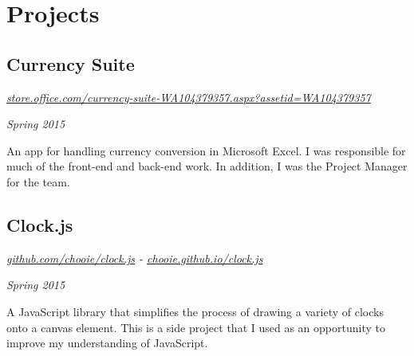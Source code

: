 \section*{Projects}

\subsection*{Currency Suite}
\noindent\begin{minipage}[b]{0.8\textwidth}
  \flushleft
  \emph{\href{https://store.office.com/currency-suite-WA104379357.aspx?assetid=WA104379357} {store.office.com/currency-suite-WA104379357.aspx?assetid=WA104379357}}
\end{minipage}
\noindent\begin{minipage}[b]{0.2\textwidth}
  \flushright
  \emph{Spring 2015}
\end{minipage}
An app for handling currency conversion in Microsoft  Excel. I was responsible for much of the front-end and back-end work. In addition, I was the Project Manager for the team.

\subsection*{Clock.js}
\noindent\begin{minipage}[b]{0.5\textwidth}
  \flushleft
  \emph{\href{https://github.com/chooie/clock.js} {github.com/chooie/clock.js} - \href {https://chooie.github.io/clock.js} {chooie.github.io/clock.js}}
\end{minipage}
\noindent\begin{minipage}[b]{0.5\textwidth}
  \flushright
  \emph{Spring 2015}
\end{minipage}
A JavaScript library that simplifies the process of drawing a variety of clocks onto a canvas element. This is a side project that I used as an opportunity to improve my understanding of JavaScript.

